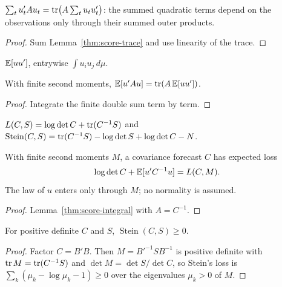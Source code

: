\begin{lemma}\label{thm:score-realized}
  \leanok
  $\sum_t u_t'Au_t=\operatorname{tr}\bigl(A\sum_t u_tu_t'\bigr)$: the summed quadratic terms
  depend on the observations only through their summed outer products.
\end{lemma}
\begin{proof}\leanok
  Sum Lemma~\ref{thm:score-trace} and use linearity of the trace.
\end{proof}

\begin{definition}\label{def:score-second-moment}
  \leanok
  $\mathbb{E}[uu']$, entrywise $\int u_iu_j\,d\mu$.
\end{definition}

\begin{lemma}\label{thm:score-integral}
  \leanok
  With finite second moments, $\mathbb{E}[u'Au]=\operatorname{tr}(A\,\mathbb{E}[uu'])$.
\end{lemma}
\begin{proof}\leanok
  Integrate the finite double sum term by term.
\end{proof}

\begin{definition}\label{def:score-loss}
  \leanok
  $L(C,S)=\log\det C+\operatorname{tr}(C^{-1}S)$ and
  $\operatorname{Stein}(C,S)=\operatorname{tr}(C^{-1}S)-\log\det S+\log\det C-N$.
\end{definition}

\begin{lemma}\label{thm:score-expected-loss}
  \leanok
  With finite second moments $M$, a covariance forecast $C$ has expected loss
  \[\log\det C+\mathbb{E}[u'C^{-1}u]=L(C,M).\]
  The law of $u$ enters only through $M$;
  no normality is assumed.
\end{lemma}
\begin{proof}\leanok
  Lemma~\ref{thm:score-integral} with $A=C^{-1}$.
\end{proof}

\begin{lemma}\label{thm:score-stein}
  \leanok
  For positive definite $C$ and $S$, $\operatorname{Stein}(C,S)\ge0$.
\end{lemma}
\begin{proof}\leanok
  Factor $C=B'B$. Then $M=B'^{-1}SB^{-1}$ is positive definite with
  $\operatorname{tr} M=\operatorname{tr}(C^{-1}S)$ and $\det M=\det S/\det C$, so Stein's loss is
  $\sum_k(\mu_k-\log\mu_k-1)\ge0$ over the eigenvalues $\mu_k>0$ of $M$.
\end{proof}

